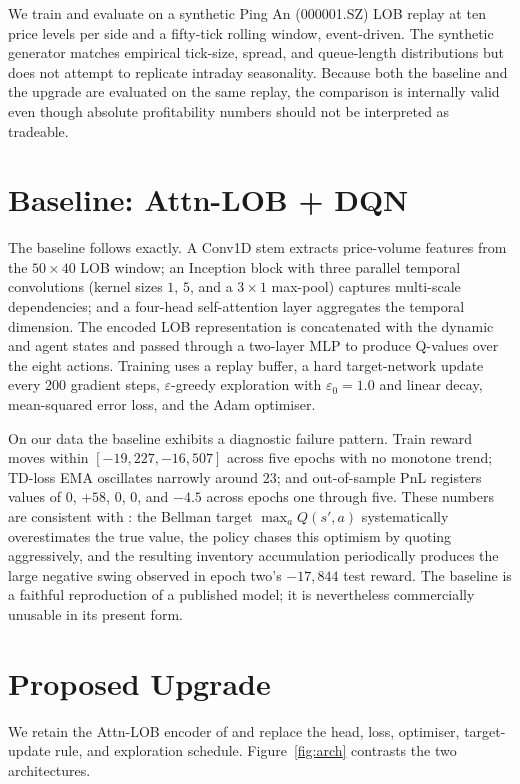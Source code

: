 \documentclass[12pt]{article}
\newcommand{\textcite}[1]{\citet{#1}}
\begin{document}
We train and evaluate on a synthetic Ping An (000001.SZ) LOB replay at ten price levels per side and a fifty-tick rolling window, event-driven. The synthetic generator matches empirical tick-size, spread, and queue-length distributions but does not attempt to replicate intraday seasonality. Because both the baseline and the upgrade are evaluated on the same replay, the comparison is internally valid even though absolute profitability numbers should not be interpreted as tradeable.

\section{Baseline: Attn-LOB + DQN}

The baseline follows \textcite{Guo2023} exactly. A Conv1D stem extracts price-volume features from the $50 \times 40$ LOB window; an Inception block with three parallel temporal convolutions (kernel sizes $1$, $5$, and a $3\times 1$ max-pool) captures multi-scale dependencies; and a four-head self-attention layer aggregates the temporal dimension. The encoded LOB representation is concatenated with the dynamic and agent states and passed through a two-layer MLP to produce Q-values over the eight actions. Training uses a replay buffer, a hard target-network update every 200 gradient steps, $\varepsilon$-greedy exploration with $\varepsilon_0 = 1.0$ and linear decay, mean-squared error loss, and the Adam optimiser.

On our data the baseline exhibits a diagnostic failure pattern. Train reward moves within $[-19{,}227, -16{,}507]$ across five epochs with no monotone trend; TD-loss EMA oscillates narrowly around $23$; and out-of-sample PnL registers values of $0$, $+58$, $0$, $0$, and $-4.5$ across epochs one through five. These numbers are consistent with \textcite{vanHasselt2016}: the Bellman target $\max_a Q(s',a)$ systematically overestimates the true value, the policy chases this optimism by quoting aggressively, and the resulting inventory accumulation periodically produces the large negative swing observed in epoch two's $-17{,}844$ test reward. The baseline is a faithful reproduction of a published model; it is nevertheless commercially unusable in its present form.

\section{Proposed Upgrade}

We retain the Attn-LOB encoder of \textcite{Guo2023} and replace the head, loss, optimiser, target-update rule, and exploration schedule. Figure~\ref{fig:arch} contrasts the two architectures.
\end{document}
